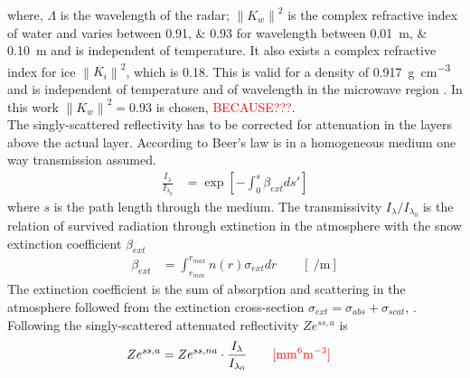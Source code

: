 where, $\Lambda$ is the wavelength of the radar; $\left\| K_w \right\|^2$ is the complex refractive index of water and varies between \numlist{0.91;0.93} for wavelength between \SIlist{0.01;0.10}{\metre} and is independent of temperature. It also exists a  complex refractive index for ice $\left\| K_i \right\|^2$, which is \SI{0.18}{}. This is valid for a density of \SI{0.917}{\gram\per\cubic\cm} and is independent of temperature and of wavelength in the microwave region \citep{doviak_doppler_1993}. In this work  $\left\| K_w \right\|^2 = 0.93$ is chosen, \textcolor{red}{BECAUSE???}. 
\\
The singly-scattered reflectivity has to be corrected for attenuation in the layers above the actual layer. According to Beer's law is in a homogeneous medium one way transmission assumed. 
\begin{align}
\frac{I_{\lambda}}{I_{\lambda_0}} & = \exp \left[ - \int_0^s \beta_{ext} ds'\right] \label{eq:Beer}
\end{align}
where $s$ is the path length through the medium. The transmissivity $I_{\lambda}/I_{\lambda_0}$ is the relation of survived radiation through extinction in the atmosphere with the snow extinction coefficient $\beta_{ext}$
\begin{align}
\beta_{ext} & = \int_{r_{min}}^{r_{max}} n(r) \sigma_{ext} dr \qquad [\SI{}{\per\metre}] \label{eq:bext}
\end{align}
The extinction coefficient is the sum of absorption and scattering in the atmosphere followed from the extinction cross-section $\sigma_{ext} = \sigma_{abs} + \sigma_{scat}$, \citep{lohmann_introduction_2016,lamb_physics_2011}. \textcolor{red}{\cite[Eq. 12.1 and more][]{lohmann_introduction_2016}} \\
Following  the singly-scattered attenuated reflectivity $Ze^{ss, a}$ is
\begin{align}
Ze^{ss, a} & = Ze^{ss, na} \cdot \frac{I_{\lambda}}{I_{\lambda_0}} \qquad \textcolor{red}{[\SI{}{\mm^6\metre^{-3}}]} \label{eq:sing_scatt_att_Z}
\end{align}
